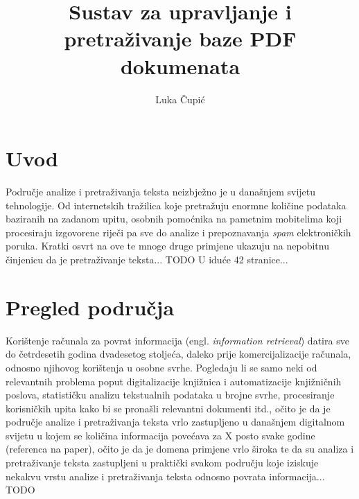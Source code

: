 \documentclass[times, utf8, zavrsni]{fer}
\begin{document}

\title{Sustav za upravljanje i pretraživanje baze PDF dokumenata}

\author{Luka Čupić}

\maketitle

\izvornik

\zahvala{}

\tableofcontents

\chapter{Uvod}
Područje analize i pretraživanja teksta neizbježno je u današnjem svijetu tehnologije. Od internetskih tražilica koje pretražuju enormne količine podataka baziranih na zadanom upitu, osobnih pomoćnika na pametnim mobitelima koji procesiraju izgovorene riječi pa sve do analize i prepoznavanja \textit{spam} elektroničkih poruka.
Kratki osvrt na ove te mnoge druge primjene ukazuju na nepobitnu činjenicu da je pretraživanje teksta... TODO
U iduće 42 stranice...

\chapter{Pregled područja}
Korištenje računala za povrat informacija (engl. \textit{information retrieval}) datira sve do četrdesetih godina dvadesetog stoljeća, daleko prije komercijalizacije računala, odnosno njihovog korištenja u osobne svrhe. Pogledaju li se samo neki od relevantnih problema poput digitalizacije knjižnica i automatizacije knjižničnih poslova, statističku analizu tekstualnih podataka u brojne svrhe, procesiranje korisničkih upita kako bi se pronašli relevantni dokumenti itd., očito je da je područje analize i pretraživanja teksta vrlo zastupljeno u današnjem digitalnom svijetu u kojem se količina informacija povećava za X posto svake godine (referenca na paper), očito je da je domena primjene vrlo široka te da su analiza i pretraživanje teksta zastupljeni u praktički svakom području koje iziskuje nekakvu vrstu analize i pretraživanja teksta odnosno povrata informacija... TODO
\end{document}
